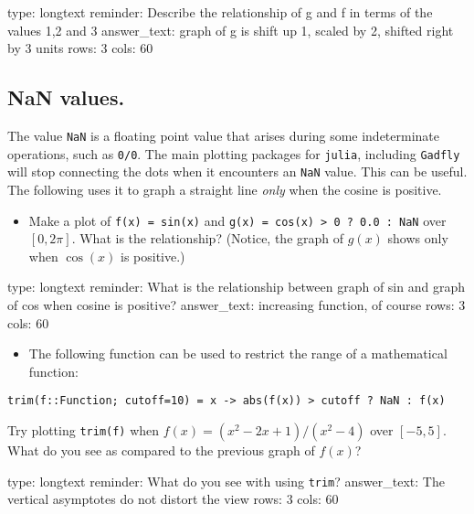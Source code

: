 \documentclass[12pt]{article}
\begin{document}
\begin{answer}
type: longtext
reminder: Describe the relationship of g and f in terms of the values 1,2 and 3
answer_text: graph of g is shift up 1, scaled by 2, shifted right by 3 units 
rows: 3
cols: 60
\end{answer}

\subsection{NaN values.}

The value \texttt{NaN} is a floating point value that arises during some
indeterminate operations, such as \texttt{0/0}. The main plotting
packages for \texttt{julia}, including \texttt{Gadfly} will stop
connecting the dots when it encounters an \texttt{NaN} value. This can
be useful. The following uses it to graph a straight line \emph{only}
when the cosine is positive.

\begin{itemize}
\itemsep1pt\parskip0pt
\item
  Make a plot of \texttt{f(x) = sin(x)} and
  \texttt{g(x) = cos(x) \textgreater{} 0 ? 0.0 : NaN} over $[0, 2\pi]$.
  What is the relationship? (Notice, the graph of $g(x)$ shows only when
  $\cos(x)$ is positive.)
\end{itemize}

\begin{answer}
type: longtext
reminder: What is the relationship between graph of sin and graph of cos when cosine is positive?
answer_text: increasing function, of course 
rows: 3
cols: 60
\end{answer}

\begin{itemize}
\itemsep1pt\parskip0pt
\item
  The following function can be used to restrict the range of a
  mathematical function:
\end{itemize}



\begin{verbatim}
trim(f::Function; cutoff=10) = x -> abs(f(x)) > cutoff ? NaN : f(x)
\end{verbatim}
Try plotting \texttt{trim(f)} when $f(x) = (x^2 - 2x + 1)/(x^2 - 4)$
over $[-5, 5]$. What do you see as compared to the previous graph of
$f(x)$?

\begin{answer}
type: longtext
reminder: What do you see with using \verb+trim+?
answer_text: The vertical asymptotes do not distort the view 
rows: 3
cols: 60
\end{answer}
\end{document}
